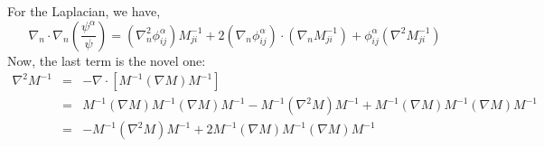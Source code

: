 \documentclass{article}
\begin{document}
For the Laplacian, we have,
\begin{equation}
\nabla_n\cdot\nabla_n\left(\frac{\psi^\alpha}{\psi}\right) =
(\nabla_n^2\phi_{ij}^\alpha)M^{-1}_{ji} +
2(\nabla_n\phi_{ij}^\alpha)\cdot(\nabla_n M^{-1}_{ji}) +
\phi^\alpha_{ij}(\nabla^2 M^{-1}_{ji})
\end{equation} 
Now, the last term is the novel one:
\begin{eqnarray}
\nabla^2 M^{-1} & = & -\nabla\cdot [M^{-1}(\nabla M) M^{-1}] \\
& = & M^{-1}(\nabla M)M^{-1}(\nabla M) M^{-1} - M^{-1}(\nabla^2 M)M^{-1}
+ M^{-1}(\nabla M) M^{-1} (\nabla M) M^{-1} \\
& = & -M^{-1} (\nabla^2 M) M^{-1} + 2 M^{-1}(\nabla M) M^{-1}(\nabla M) M^{-1}
\end{eqnarray}
\end{document}
